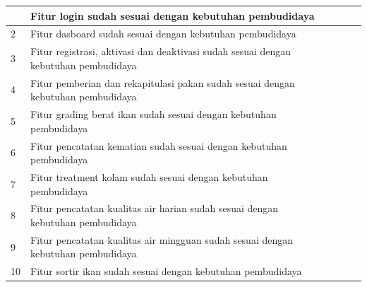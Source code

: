 \begin{enumerate}
\begin{longtable}[c]{@{} |p{1cm}|p{6.5cm}|p{1.1cm}|p{1.1cm}|p{1.1cm}|p{1.1cm}| @{}}
 \hline
 \endfoot

 \hline
 \endlastfoot

 \hline
 1 & Fitur login sudah sesuai dengan kebutuhan pembudidaya &  &  &  &\\
 \hline
 2 & Fitur dasboard sudah sesuai dengan kebutuhan pembudidaya &  &  &  &\\
 \hline
 3 & Fitur registrasi, aktivasi dan deaktivasi sudah sesuai dengan kebutuhan pembudidaya &  &  &  &\\
 \hline
 4 & Fitur pemberian dan rekapitulasi pakan sudah sesuai dengan kebutuhan pembudidaya &  &  &  &\\
 \hline
 5 & Fitur grading berat ikan sudah sesuai dengan kebutuhan pembudidaya &  &  &  &\\
 \hline
 6 & Fitur pencatatan kematian sudah sesuai dengan kebutuhan pembudidaya &  &  &  &\\
 \hline
 7 & Fitur treatment kolam sudah sesuai dengan kebutuhan pembudidaya &  &  &  &\\
 \hline
 8 & Fitur pencatatan kualitas air harian sudah sesuai dengan kebutuhan pembudidaya &  &  &  &\\
 \hline
 9 & Fitur pencatatan kualitas air mingguan sudah sesuai dengan kebutuhan pembudidaya &  &  &  &\\
 \hline
 10 & Fitur sortir ikan sudah sesuai dengan kebutuhan pembudidaya &  &  &  &\\
 \hline
 \end{longtable}


\end{enumerate}


